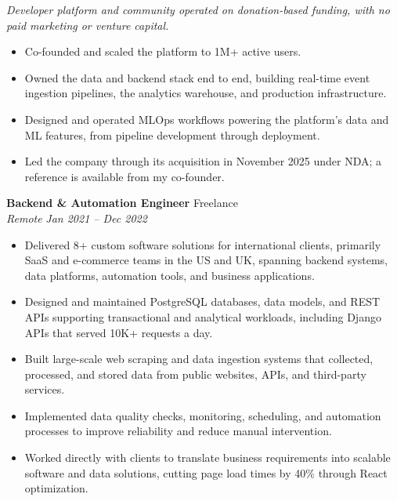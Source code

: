 \documentclass[10.5pt,letterpaper]{article}
\newcommand{\role}[4]{%
  \textbf{#1} \hfill #2 \\
  \textit{#3} \hfill \textit{#4}%
}
\begin{document}
\textit{Developer platform and community operated on donation-based funding, with no paid marketing or venture capital.}
\begin{itemize}
  \item Co-founded and scaled the platform to 1M+ active users.
  \item Owned the data and backend stack end to end, building real-time event ingestion pipelines, the analytics warehouse, and production infrastructure.
  \item Designed and operated MLOps workflows powering the platform's data and ML features, from pipeline development through deployment.
  \item Led the company through its acquisition in November 2025 under NDA; a reference is available from my co-founder.
\end{itemize}
\vspace{2pt}
\role{Backend \& Automation Engineer}{Freelance}{Remote}{Jan 2021 -- Dec 2022}
\begin{itemize}
  \item Delivered 8+ custom software solutions for international clients, primarily SaaS and e-commerce teams in the US and UK, spanning backend systems, data platforms, automation tools, and business applications.
  \item Designed and maintained PostgreSQL databases, data models, and REST APIs supporting transactional and analytical workloads, including Django APIs that served 10K+ requests a day.
  \item Built large-scale web scraping and data ingestion systems that collected, processed, and stored data from public websites, APIs, and third-party services.
  \item Implemented data quality checks, monitoring, scheduling, and automation processes to improve reliability and reduce manual intervention.
  \item Worked directly with clients to translate business requirements into scalable software and data solutions, cutting page load times by 40\% through React optimization.
\end{itemize}
\end{document}
